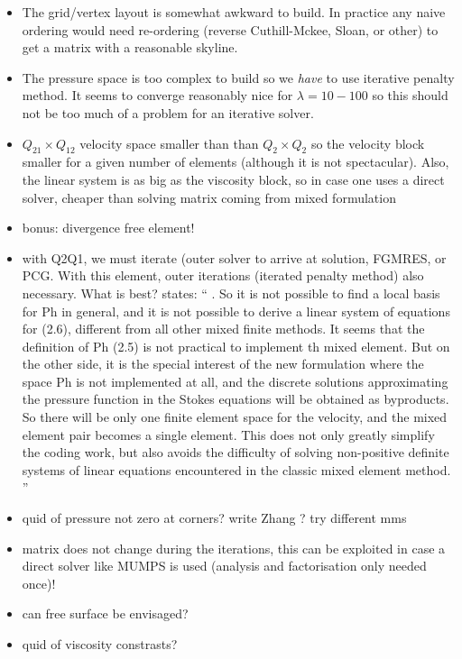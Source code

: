 \begin{itemize}

\item The grid/vertex layout is somewhat awkward to build. In practice any naive ordering 
would need re-ordering (reverse Cuthill-Mckee, Sloan, or other) to get a matrix with a reasonable skyline.

\item The pressure space is too complex to build so we {\it have} to use iterative penalty method. 
It seems to converge reasonably nice for $\lambda=10-100$ so this should not 
be too much of a problem for an iterative solver.

\item $Q_{21}\times Q_{12}$ velocity space smaller than than $Q_2\times Q_2$ so the velocity
block smaller for a given number of elements (although it is not spectacular). 
Also, the linear system is as big as the viscosity block, so in case one uses 
a direct solver, cheaper than solving matrix coming from mixed formulation

\item bonus: divergence free element!

\item with Q2Q1, we must iterate (outer solver to arrive at solution, FGMRES, or PCG. 
With this element, outer iterations (iterated penalty method) also necessary. What is best?
\textcite{zhan08} states: `` 
. So it is not possible to find a local basis for Ph in general, and it is not possible to
derive a linear system of equations for (2.6), different from all other mixed finite methods. It
seems that the definition of Ph (2.5) is not practical to implement th mixed element. But
on the other side, it is the special interest of the new formulation where the space Ph is not
implemented at all, and the discrete solutions approximating the pressure function in the Stokes
equations will be obtained as byproducts. So there will be only one finite element space for 
the velocity, and the mixed element pair becomes a single element. This does not only greatly 
simplify the coding work, but also avoids the difficulty of solving non-positive definite systems
of linear equations encountered in the classic mixed element method.
''

\item quid of pressure not zero at corners? write Zhang ? try different mms 

\item matrix does not change during the iterations, this can be exploited in case a direct solver
like MUMPS is used (analysis and factorisation only needed once)!

\item can free surface be envisaged?

\item quid of viscosity constrasts? 

\end{itemize}

